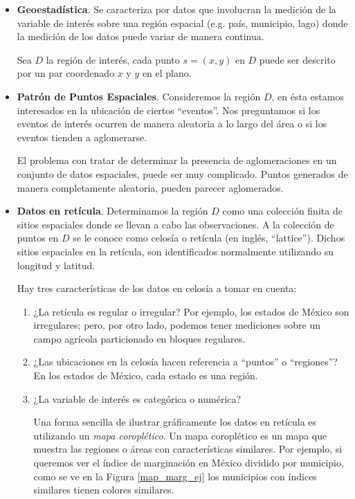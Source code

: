 \begin{itemize}

\item \textbf{Geoestadística}. Se caracteriza por datos que involucran la medición de la variable de interés sobre una región espacial (e.g. país, municipio, lago) donde la medición de los datos puede variar de manera continua.

Sea $D$ la región de interés, cada punto $s=(x,y)$ en $D$ puede ser descrito por un par coordenado $x$ y $y$ en el plano.

\item \textbf{Patrón de Puntos Espaciales}. Consideremos la región $D$, en ésta estamos interesados en la ubicación de ciertos ``eventos''. Nos preguntamos si los eventos de interés ocurren de manera aleatoria a lo largo del área o si los eventos tienden a aglomerarse.

El problema con tratar de determinar la presencia de aglomeraciones en un conjunto de datos espaciales, puede ser muy complicado. Puntos generados de manera completamente aleatoria, pueden parecer aglomerados.

\item \textbf{Datos en retícula}. Determinamos la región $D$ como una colección finita de sitios espaciales donde se llevan a cabo las observaciones. A la colección de puntos en $D$ se le conoce como celosía o retícula (en inglés, ``lattice'').  Dichos sitios espaciales en la retícula, son identificados normalmente utilizando su longitud y latitud.

Hay tres características de los datos en celosía a tomar en cuenta:
\begin{enumerate}
\item ¿La retícula es regular o irregular? Por ejemplo, los estados de México son irregulares; pero, por otro lado, podemos tener mediciones sobre un campo agrícola particionado en bloques regulares.
\item ¿Las ubicaciones en la celosía hacen referencia a ``puntos'' o ``regiones''? En los estados de México, cada estado es una región.
\item ¿La variable de interés es categórica o numérica?

Una forma sencilla de ilustrar gráficamente los datos en retícula es utilizando un \textit{mapa coroplético}. Un mapa coroplético es un mapa que muestra las regiones o áreas con características similares. Por ejemplo, si queremos ver el índice de marginación en México dividido por municipio, como se ve en la Figura \ref{map_marg_ej} los municipios con índices similares tienen colores similares.


\end{enumerate}
\end{itemize}
